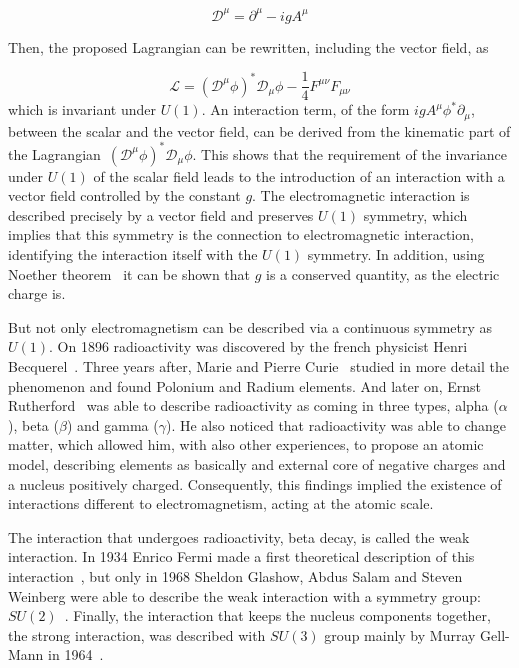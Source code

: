 \begin{equation}
  \label{eq:covderivU1}
  \mathcal{D}^{\mu}=\partial^{\mu}-igA^{\mu}
\end{equation}

Then, the proposed Lagrangian can be rewritten, including the vector field, as

\begin{equation}
  \label{eq:FullLagU1inv}
  \mathcal{L}=(\mathcal{D}^{\mu}\phi)^{*}\mathcal{D}_{\mu}\phi-\frac{1}{4}F^{\mu\nu}F_{\mu\nu}
\end{equation}which is invariant under $U(1)$. An interaction term, of the form $igA^{\mu}\phi^{*}\partial_{\mu}$, between the scalar and the vector field, can be derived from the kinematic part of the Lagrangian~$(\mathcal{D}^{\mu}\phi)^{*}\mathcal{D}_{\mu}\phi$. This shows that the requirement of the invariance under $U(1)$ of the scalar field leads to the introduction of an interaction with a vector field controlled by the constant $g$. The electromagnetic interaction is described precisely by a vector field and preserves $U(1)$ symmetry, which implies that this symmetry is the connection to electromagnetic interaction, identifying the interaction itself with the $U(1)$ symmetry. In addition, using Noether theorem~\cite{1971TTSP....1..186N} it can be shown that $g$ is a conserved quantity, as the electric charge is.

But not only electromagnetism can be described via a continuous symmetry as $U(1)$. On 1896 radioactivity was discovered by the french physicist Henri Becquerel~\cite{Becquerel:1896zz}. Three years after, Marie and Pierre Curie~\cite{Curie:1898} studied in more detail the phenomenon and found Polonium and Radium elements. And later on, Ernst Rutherford~\cite{Rutherford:1911zz} was able to describe radioactivity as coming in three types, alpha ($\alpha$), beta ($\beta$) and gamma ($\gamma$). He also noticed that radioactivity was able to change matter, which allowed him, with also other experiences, to propose an atomic model, describing elements as basically and external core of negative charges and a nucleus positively charged. Consequently, this findings implied the existence of interactions different to electromagnetism, acting at the atomic scale.

The interaction that undergoes radioactivity, beta decay, is called the weak interaction. In 1934 Enrico Fermi made a first theoretical description of this interaction~\cite{Fermi:1934hr}, but only in 1968 Sheldon Glashow, Abdus Salam and Steven Weinberg were able to describe the weak interaction with a symmetry group: $SU(2)$~\cite{Glashow:1967rx, Salam:1968rm}. Finally, the interaction that keeps the nucleus components together, the strong interaction, was described with $SU(3)$ group mainly by Murray Gell-Mann in 1964~\cite{GellMann:1964nj}.

